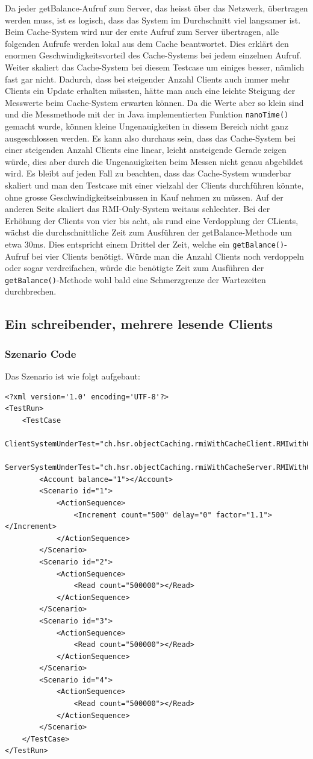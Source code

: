 Da jeder getBalance-Aufruf zum Server, das heisst über das Netzwerk, übertragen werden muss, ist es logisch, dass das System im Durchschnitt viel langsamer ist. Beim Cache-System wird nur der erste Aufruf zum Server übertragen, alle folgenden Aufrufe werden lokal aus dem Cache beantwortet. Dies erklärt den enormen Geschwindigkeitsvorteil des Cache-Systems bei jedem einzelnen Aufruf. \newline
Weiter skaliert das Cache-System bei diesem Testcase um einiges besser, nämlich fast gar nicht. Dadurch, dass bei steigender Anzahl Clients auch immer mehr Clients ein Update erhalten müssten, hätte man auch eine leichte Steigung der Messwerte beim Cache-System erwarten können. Da die Werte aber so klein sind und die Messmethode mit der in Java implementierten Funktion \texttt{nanoTime()} gemacht wurde, können kleine Ungenauigkeiten in diesem Bereich nicht ganz ausgeschlossen werden. Es kann also durchaus sein, dass das Cache-System bei einer steigenden Anzahl Clients eine linear, leicht ansteigende Gerade zeigen würde, dies aber durch die Ungenauigkeiten beim Messen nicht genau abgebildet wird. Es bleibt auf jeden Fall zu beachten, dass das Cache-System wunderbar skaliert und man den Testcase mit einer vielzahl der Clients durchführen könnte, ohne grosse Geschwindigkeitseinbussen in Kauf nehmen zu müssen. \newline
Auf der anderen Seite skaliert das RMI-Only-System weitaus schlechter. Bei der Erhöhung der Clients von vier bis acht, als rund eine Verdopplung der CLients, wächst die durchschnittliche Zeit zum Ausführen der getBalance-Methode um etwa 30ms. Dies entspricht einem Drittel der Zeit, welche ein \texttt{getBalance()}-Aufruf bei vier Clients benötigt. Würde man die Anzahl Clients noch verdoppeln oder sogar verdreifachen, würde die benötigte Zeit zum Ausführen der \texttt{getBalance()}-Methode wohl bald eine Schmerzgrenze der Wartezeiten durchbrechen.


\subsection{Ein schreibender, mehrere lesende Clients}
\subsubsection{Szenario Code}
Das Szenario ist wie folgt aufgebaut:
\begin{lstlisting}
<?xml version='1.0' encoding='UTF-8'?>
<TestRun>
	<TestCase
		ClientSystemUnderTest="ch.hsr.objectCaching.rmiWithCacheClient.RMIwithCacheClientSystem"
		ServerSystemUnderTest="ch.hsr.objectCaching.rmiWithCacheServer.RMIWithCacheServerSystem">
		<Account balance="1"></Account>
		<Scenario id="1">
			<ActionSequence>
				<Increment count="500" delay="0" factor="1.1"></Increment>
			</ActionSequence>
		</Scenario>
		<Scenario id="2">
			<ActionSequence>
				<Read count="500000"></Read>
			</ActionSequence>
		</Scenario>
		<Scenario id="3">
			<ActionSequence>
				<Read count="500000"></Read>
			</ActionSequence>
		</Scenario>
		<Scenario id="4">
			<ActionSequence>
				<Read count="500000"></Read>
			</ActionSequence>
		</Scenario>
	</TestCase>
</TestRun>
\end{lstlisting}
